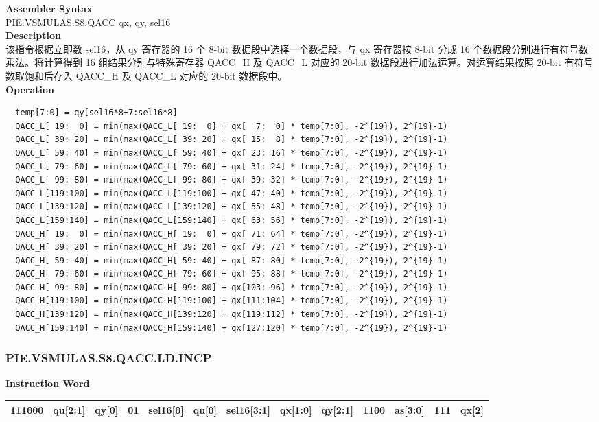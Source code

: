 \textbf{Assembler Syntax} \\
PIE.VSMULAS.S8.QACC qx, qy, sel16 \\
\textbf{Description} \\
该指令根据立即数 sel16，从 qy 寄存器的 16 个 8-bit 数据段中选择一个数据段，与 qx 寄存器按 8-bit 分成 16 个数据段分别进行有符号数乘法。将计算得到 16 组结果分别与特殊寄存器 QACC\_H 及 QACC\_L 对应的 20-bit 数据段进行加法运算。对运算结果按照 20-bit 有符号数取饱和后存入 QACC\_H 及 QACC\_L 对应的 20-bit 数据段中。\\
\textbf{Operation}
\begin{lstlisting}
  temp[7:0] = qy[sel16*8+7:sel16*8]
  QACC_L[ 19:  0] = min(max(QACC_L[ 19:  0] + qx[  7:  0] * temp[7:0], -2^{19}), 2^{19}-1)
  QACC_L[ 39: 20] = min(max(QACC_L[ 39: 20] + qx[ 15:  8] * temp[7:0], -2^{19}), 2^{19}-1)
  QACC_L[ 59: 40] = min(max(QACC_L[ 59: 40] + qx[ 23: 16] * temp[7:0], -2^{19}), 2^{19}-1)
  QACC_L[ 79: 60] = min(max(QACC_L[ 79: 60] + qx[ 31: 24] * temp[7:0], -2^{19}), 2^{19}-1)
  QACC_L[ 99: 80] = min(max(QACC_L[ 99: 80] + qx[ 39: 32] * temp[7:0], -2^{19}), 2^{19}-1)
  QACC_L[119:100] = min(max(QACC_L[119:100] + qx[ 47: 40] * temp[7:0], -2^{19}), 2^{19}-1)
  QACC_L[139:120] = min(max(QACC_L[139:120] + qx[ 55: 48] * temp[7:0], -2^{19}), 2^{19}-1)
  QACC_L[159:140] = min(max(QACC_L[159:140] + qx[ 63: 56] * temp[7:0], -2^{19}), 2^{19}-1)
  QACC_H[ 19:  0] = min(max(QACC_H[ 19:  0] + qx[ 71: 64] * temp[7:0], -2^{19}), 2^{19}-1)
  QACC_H[ 39: 20] = min(max(QACC_H[ 39: 20] + qx[ 79: 72] * temp[7:0], -2^{19}), 2^{19}-1)
  QACC_H[ 59: 40] = min(max(QACC_H[ 59: 40] + qx[ 87: 80] * temp[7:0], -2^{19}), 2^{19}-1)
  QACC_H[ 79: 60] = min(max(QACC_H[ 79: 60] + qx[ 95: 88] * temp[7:0], -2^{19}), 2^{19}-1)
  QACC_H[ 99: 80] = min(max(QACC_H[ 99: 80] + qx[103: 96] * temp[7:0], -2^{19}), 2^{19}-1)
  QACC_H[119:100] = min(max(QACC_H[119:100] + qx[111:104] * temp[7:0], -2^{19}), 2^{19}-1)
  QACC_H[139:120] = min(max(QACC_H[139:120] + qx[119:112] * temp[7:0], -2^{19}), 2^{19}-1)
  QACC_H[159:140] = min(max(QACC_H[159:140] + qx[127:120] * temp[7:0], -2^{19}), 2^{19}-1)
\end{lstlisting}

\newpage
\subsubsection{PIE.VSMULAS.S8.QACC.LD.INCP}\label{instruction:PIEVSMULASS8QACCLDINCP}
\setlength\tabcolsep{6pt}
\textbf{Instruction Word} \\
\begin{tabular}{|c|c|c|c|c|c|c|c|c|c|c|c|c|}
	\hline
	111000 & qu[2:1] & qy[0] & 01 & sel16[0] & qu[0] & sel16[3:1] & qx[1:0] & qy[2:1] & 1100 & as[3:0] & 111 & qx[2] \\
	\hline
\end{tabular}

